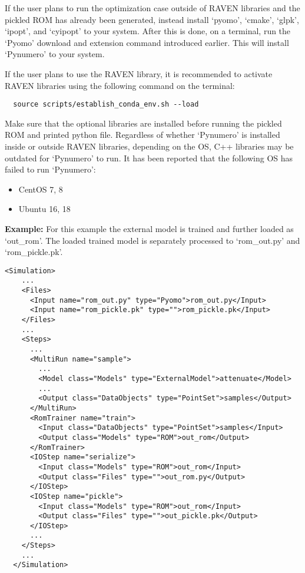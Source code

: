 If the user plans to run the optimization case outside of RAVEN libraries and the pickled ROM has already been generated, instead install `pyomo', `cmake',
`glpk', `ipopt', and `cyipopt' to your system. After this is done, on a terminal, run the `Pyomo' download and extension command introduced earlier.
This will install `Pynumero' to your system.

If the user plans to use the RAVEN library, it is recommended to activate RAVEN libraries using the following command
on the terminal:

\begin{lstlisting}
  source scripts/establish_conda_env.sh --load
\end{lstlisting}

Make sure that the optional libraries are installed before running the pickled ROM and printed python file. Regardless of whether `Pynumero' is
installed inside or outside RAVEN libraries, depending on the OS, C++ libraries may be outdated for `Pynumero' to run. It has been reported that
the following OS has failed to run `Pynumero':

\begin{itemize}
  \item CentOS 7, 8
  \item Ubuntu 16, 18
\end{itemize}

\textbf{Example:} For this example the external model is trained and further loaded as `out\_rom'. The loaded trained model is separately
processed to `rom\_out.py' and `rom\_pickle.pk'.
\begin{lstlisting}[style=XML,morekeywords={name,subType}]
  <Simulation>
    ...
    <Files>
      <Input name="rom_out.py" type="Pyomo">rom_out.py</Input>
      <Input name="rom_pickle.pk" type="">rom_pickle.pk</Input>
    </Files>
    ...
    <Steps>
      ...
      <MultiRun name="sample">
        ...
        <Model class="Models" type="ExternalModel">attenuate</Model>
        ...
        <Output class="DataObjects" type="PointSet">samples</Output>
      </MultiRun>
      <RomTrainer name="train">
        <Input class="DataObjects" type="PointSet">samples</Input>
        <Output class="Models" type="ROM">out_rom</Output>
      </RomTrainer>
      <IOStep name="serialize">
        <Input class="Models" type="ROM">out_rom</Input>
        <Output class="Files" type="">out_rom.py</Output>
      </IOStep>
      <IOStep name="pickle">
        <Input class="Models" type="ROM">out_rom</Input>
        <Output class="Files" type="">out_pickle.pk</Output>
      </IOStep>
      ...
    </Steps>
    ...
  </Simulation>
\end{lstlisting}
